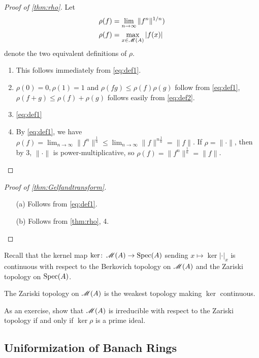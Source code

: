 \begin{proof}[Proof of \autoref{thm:rho}]
Let 
\begin{align}\label{eq:def1}
  \rho(f) &= \lim_{n\to \infty} \|f^n\|^{1/n}) \\ \label{eq:def2}
  \rho(f) &= \max_{x\in \operatorname{\mathscr{M}}(A)} |f(x)|
\end{align}
denote the two equivalent definitions of $\rho$. 
\begin{enumerate}
\item
This follows immediately from \eqref{eq:def1}.

\item
$\rho(0)=0,\rho(1)=1$ and $\rho(fg)\leqslant\rho(f)\rho(g)$ follow from 
\eqref{eq:def1}, $\rho(f+g)\leqslant\rho(f)+\rho(g)$ follows easily from 
\eqref{eq:def2}.

\item
\eqref{eq:def1}

\item
By \eqref{eq:def1}, we have 
$\rho(f)=\lim_{n\to\infty} \|f^n\|^{\frac{1}{n}}\leq \lim_{n\to\infty}\|f\|^{n\frac{1}{n}}=\|f\|$. 
If $\rho=\|\cdot\|$, then by 3, $\|\cdot\|$ is power-multiplicative, so 
$\rho(f)=\|f^n\|^{\frac{1}{n}}=\|f\|$.
\end{enumerate}
\end{proof}
\begin{proof}[Proof of \autoref{thm:Gelfandtransform}]
\begin{enumerate}
\item[(a)] Follows from \eqref{eq:def1}.
\item[(b)] Follows from \autoref{thm:rho}, 4.
\end{enumerate}
\end{proof}
Recall that the kernel map $\ker\colon\operatorname{\mathscr{M}}(A)\to\operatorname{Spec}(A)$ sending 
$x\mapsto \ker |\cdot|_x$ is continuous with respect to the Berkovich topology 
on $\operatorname{\mathscr{M}}(A)$ and the Zariski topology on $\operatorname{Spec}(A)$.

\begin{definition}\label{def:zariskiberkspec}
The Zariski topology on $\operatorname{\mathscr{M}}(A)$ is the weakest topology making $\ker$ 
continuous.
\end{definition}

As an exercise, show that $\operatorname{\mathscr{M}}(A)$ is irreducible with respect to the 
Zariski topology if and only if $\ker\rho$ is a prime ideal.


\subsection{Uniformization of Banach Rings}

